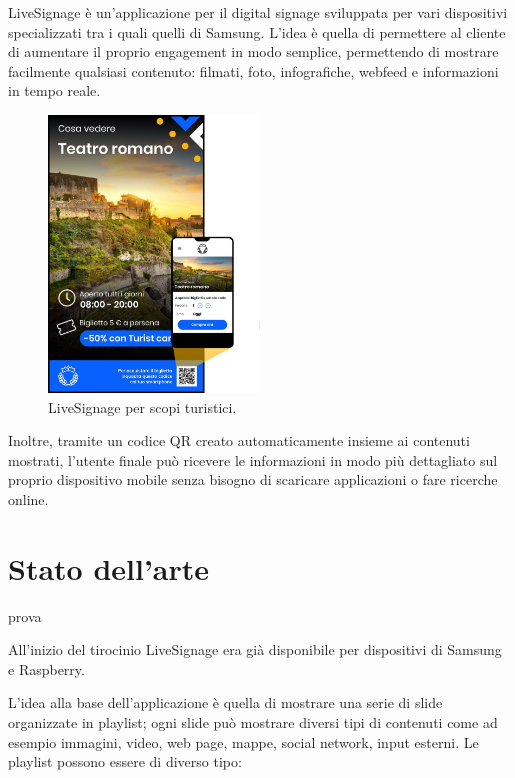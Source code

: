 LiveSignage è un’applicazione per il digital signage sviluppata per vari dispositivi specializzati tra i quali quelli di Samsung. L’idea è quella di permettere al cliente di aumentare il proprio engagement in modo semplice, permettendo di mostrare facilmente qualsiasi contenuto: filmati, foto, infografiche, webfeed e informazioni in tempo reale.

\begin{figure}[!htb]
    \centering
    \includegraphics[width= 0.5\textwidth]{images/Introduzione/LiveTurist.jpg} 
    \caption{LiveSignage per scopi turistici.} 
\end{figure}

Inoltre, tramite un codice QR creato automaticamente insieme ai contenuti mostrati, l'utente finale può ricevere le informazioni in modo più dettagliato sul proprio dispositivo mobile senza bisogno di scaricare applicazioni o fare ricerche online.


\section{Stato dell'arte}

prova

All'inizio del tirocinio LiveSignage era già disponibile per dispositivi di Samsung e Raspberry.  

L'idea alla base dell'applicazione è quella di mostrare una serie di slide organizzate in playlist; ogni slide può mostrare diversi tipi di contenuti come ad esempio immagini, video, web page, mappe, social network, input esterni. Le playlist possono essere di diverso tipo:

